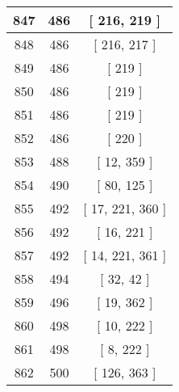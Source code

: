 \begin{center}
\begin{longtable}[H]{|| c c c ||}
847 & 486 & [ 216, 219 ] \\ 
\hline
848 & 486 & [ 216, 217 ] \\ 
\hline
849 & 486 & [ 219 ] \\ 
\hline
850 & 486 & [ 219 ] \\ 
\hline
851 & 486 & [ 219 ] \\ 
\hline
852 & 486 & [ 220 ] \\ 
\hline
853 & 488 & [ 12, 359 ] \\ 
\hline
854 & 490 & [ 80, 125 ] \\ 
\hline
855 & 492 & [ 17, 221, 360 ] \\ 
\hline
856 & 492 & [ 16, 221 ] \\ 
\hline
857 & 492 & [ 14, 221, 361 ] \\ 
\hline
858 & 494 & [ 32, 42 ] \\ 
\hline
859 & 496 & [ 19, 362 ] \\ 
\hline
860 & 498 & [ 10, 222 ] \\ 
\hline
861 & 498 & [ 8, 222 ] \\ 
\hline
862 & 500 & [ 126, 363 ] \\ 
\hline
\end{longtable}
\end{center}
